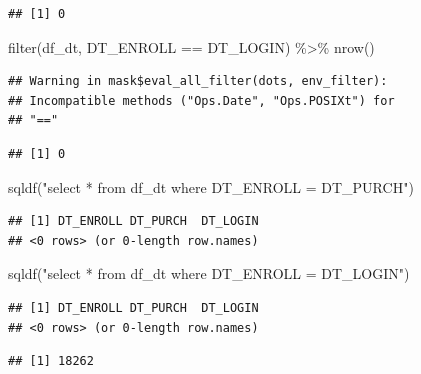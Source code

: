 \documentclass[
]{krantz}
\makeatletter
\newenvironment{Shaded}{\begin{snugshade}}{\end{snugshade}}
\newcommand{\FunctionTok}[1]{\textcolor[rgb]{0,0,0}{#1}}
\newcommand{\NormalTok}[1]{#1}
\newcommand{\SpecialCharTok}[1]{\textcolor[rgb]{0,0,0}{#1}}
\newcommand{\StringTok}[1]{\textcolor[rgb]{0.5,0.5,0.5}{#1}}
\newenvironment{kframe}{%
\medskip{}
\setlength{\fboxsep}{.8em}
 \def\at@end@of@kframe{}%
 \ifinner\ifhmode%
  \def\at@end@of@kframe{\end{minipage}}%
  \begin{minipage}{\columnwidth}%
 \fi\fi%
 \def\FrameCommand##1{\hskip\@totalleftmargin \hskip-\fboxsep
 \colorbox{shadecolor}{##1}\hskip-\fboxsep
     \hskip-\linewidth \hskip-\@totalleftmargin \hskip\columnwidth}%
 \MakeFramed {\advance\hsize-\width
   \@totalleftmargin\z@ \linewidth\hsize
   \@setminipage}}%
 {\par\unskip\endMakeFramed%
 \at@end@of@kframe}
\renewenvironment{Shaded}{\begin{kframe}}{\end{kframe}}
\makeatother
\begin{document}
\begin{verbatim}
## [1] 0
\end{verbatim}

\begin{Shaded}
\begin{Highlighting}[]
\FunctionTok{filter}\NormalTok{(df\_dt, DT\_ENROLL }\SpecialCharTok{==}\NormalTok{ DT\_LOGIN) }\SpecialCharTok{\%\textgreater{}\%} \FunctionTok{nrow}\NormalTok{()}
\end{Highlighting}
\end{Shaded}

\begin{verbatim}
## Warning in mask$eval_all_filter(dots, env_filter):
## Incompatible methods ("Ops.Date", "Ops.POSIXt") for
## "=="
\end{verbatim}

\begin{verbatim}
## [1] 0
\end{verbatim}

\begin{Shaded}
\begin{Highlighting}[]
\FunctionTok{sqldf}\NormalTok{(}\StringTok{"select * from df\_dt where DT\_ENROLL = DT\_PURCH"}\NormalTok{)}
\end{Highlighting}
\end{Shaded}

\begin{verbatim}
## [1] DT_ENROLL DT_PURCH  DT_LOGIN 
## <0 rows> (or 0-length row.names)
\end{verbatim}

\begin{Shaded}
\begin{Highlighting}[]
\FunctionTok{sqldf}\NormalTok{(}\StringTok{"select * from df\_dt where DT\_ENROLL = DT\_LOGIN"}\NormalTok{)}
\end{Highlighting}
\end{Shaded}

\begin{verbatim}
## [1] DT_ENROLL DT_PURCH  DT_LOGIN 
## <0 rows> (or 0-length row.names)
\end{verbatim}

\begin{Shaded}
\end{Shaded}

\begin{verbatim}
## [1] 18262
\end{verbatim}
\end{document}
